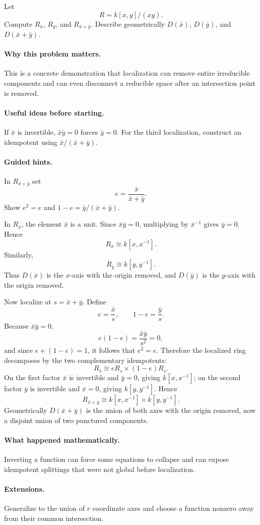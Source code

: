 \begin{problem}
Let
\[
R=k[x,y]/(xy).
\]
Compute $R_{\bar x}$, $R_{\bar y}$, and $R_{\bar x+\bar y}$.  Describe geometrically
$D(\bar x)$, $D(\bar y)$, and $D(\bar x+\bar y)$.
\end{problem}

\paragraph{Why this problem matters.}
This is a concrete demonstration that localization can remove entire irreducible components
and can even disconnect a reducible space after an intersection point is removed.

\paragraph{Useful ideas before starting.}
If $\bar x$ is invertible, $\bar x\bar y=0$ forces $\bar y=0$.  For the third localization,
construct an idempotent using $\bar x/(\bar x+\bar y)$.

\paragraph{Guided hints.}
In $R_{\bar x+\bar y}$ set
\[
e=\frac{\bar x}{\bar x+\bar y}.
\]
Show $e^2=e$ and $1-e=\bar y/(\bar x+\bar y)$.

\begin{solution}
In $R_{\bar x}$, the element $\bar x$ is a unit.  Since $\bar x\bar y=0$, multiplying by
$\bar x^{-1}$ gives $\bar y=0$.  Hence
\[
R_{\bar x}\cong k[x,x^{-1}].
\]
Similarly,
\[
R_{\bar y}\cong k[y,y^{-1}].
\]
Thus $D(\bar x)$ is the $x$-axis with the origin removed, and $D(\bar y)$ is the
$y$-axis with the origin removed.

Now localize at $s=\bar x+\bar y$.  Define
\[
e=\frac{\bar x}{s},
\qquad
1-e=\frac{\bar y}{s}.
\]
Because $\bar x\bar y=0$,
\[
e(1-e)=\frac{\bar x\bar y}{s^2}=0,
\]
and since $e+(1-e)=1$, it follows that $e^2=e$.  Therefore the localized ring decomposes
by the two complementary idempotents:
\[
R_s\cong eR_s\times(1-e)R_s.
\]
On the first factor $\bar x$ is invertible and $\bar y=0$, giving
$k[x,x^{-1}]$; on the second factor $\bar y$ is invertible and $\bar x=0$, giving
$k[y,y^{-1}]$.  Hence
\[
R_{\bar x+\bar y}
\cong
k[x,x^{-1}]\times k[y,y^{-1}].
\]
Geometrically $D(\bar x+\bar y)$ is the union of both axes with the origin removed, now a
disjoint union of two punctured components.
\end{solution}

\paragraph{What happened mathematically.}
Inverting a function can force some equations to collapse and can expose idempotent
splittings that were not global before localization.

\paragraph{Extensions.}
Generalize to the union of $r$ coordinate axes and choose a function nonzero away from their
common intersection.
